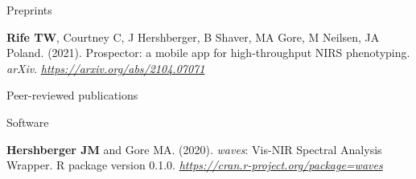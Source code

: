 

\begin{cventries}

  \cvbib
    {Preprints} %
    {
      \begin{cvitems} %
        \item {\textbf{Rife TW}, Courtney C, J Hershberger, B Shaver, MA Gore, M Neilsen, JA Poland. (2021). Prospector: a mobile app for high-throughput NIRS phenotyping. \textit{arXiv}.  \href{https://arxiv.org/abs/2104.07071}{\textit{https://arxiv.org/abs/2104.07071}}}
      \end{cvitems}
    }

  \cvbib
    {Peer-reviewed publications} %
    {
      \begin{cvitems} %
      \end{cvitems}
    }

  \cvbib
    {Software} %
    {
      \begin{cvitems} %
        \item {\textbf{Hershberger JM} and Gore MA. (2020). \textit{waves}: Vis-NIR Spectral Analysis Wrapper. R package version 0.1.0. \href{https://cran.r-project.org/package=waves}{\textit{https://cran.r-project.org/package=waves}}}
      \end{cvitems}
    }
\end{cventries}